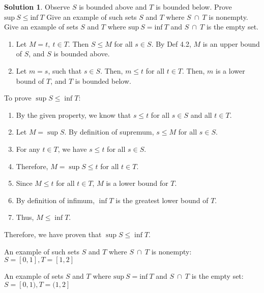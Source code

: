 \documentclass[12pt]{article}
\theoremstyle{definition} %
\newtheorem{solution}{Solution}
\theoremstyle{plain} %
\begin{document}
\begin{solution}
         Observe $S$ is bounded above and $T$ is bounded below.
         Prove $\text{sup}\ S \leq \text{inf}\ T$
         Give an example of such sets $S$ and $T$ where $S \ \cap \ T$ is nonempty.
         Give an example of sets $S$ and $T$ where $\text{sup}\ S = \text{inf}\ T$ and $S \ \cap \ T$ is the empty set.

    

        \begin{enumerate}
            \item Let $M=t,\ t \in T$. Then $S\leq M$ for all $s\in S$. By Def 4.2, $M$ is an upper bound of $S$, and $S$ is bounded above.
            \item Let $m=s$, such that $s\in S$. Then, $m\leq t$ for all $t \in T$. Then, $m$ is a lower bound of $T$, and $T$ is bounded below.
        \end{enumerate}
        
     To prove $\sup S \leq \inf T$:
        \begin{enumerate}
            \item By the given property, we know that $s \leq t$ for all $s \in S$ and all $t \in T$.
            \item Let $M = \sup S$. By definition of supremum, $s \leq M$ for all $s \in S$.
            \item For any $t \in T$, we have $s \leq t$ for all $s \in S$.
            \item Therefore, $M = \sup S \leq t$ for all $t \in T$.
            \item Since $M \leq t$ for all $t \in T$, $M$ is a lower bound for $T$.
            \item By definition of infimum, $\inf T$ is the greatest lower bound of $T$.
            \item Thus, $M \leq \inf T$.
        \end{enumerate}
        Therefore, we have proven that $\sup S \leq \inf T$. 
    
        
         An example of such sets $S$ and $T$ where $S \ \cap \ T$ is nonempty: $S=[0,1], T=[1,2]$
        
       An example of sets $S$ and $T$ where $\text{sup}\ S = \text{inf}\ T$ and $S \ \cap \ T$ is the empty set: $S=[0,1), T=(1,2]$
    
\end{solution}
\end{document}
